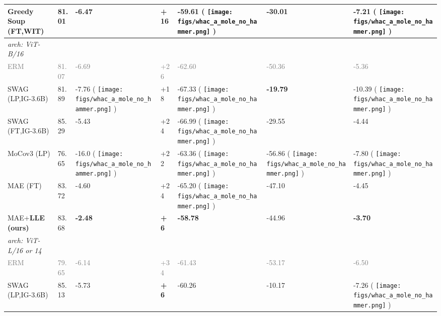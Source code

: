 \documentclass[10pt,twocolumn,letterpaper]{article}
\DeclareRobustCommand{\molenohammer}{\begingroup\normalfont
  \texttt{[image: figs/whac\_a\_mole\_no\_hammer.png]}\endgroup
}
\begin{document}
\begin{table}[t]
\begin{adjustbox}{width=\linewidth}
\begin{tabular}{@{}lllllll@{}}
Greedy Soup \scriptsize{(FT,WIT)}      & 81.01         & \textbf{-6.47}   & \textbf{+16} & -59.61 \scriptsize{(\textcolor{red}{} \molenohammer)} & -30.01 & -7.21  \scriptsize{(\textcolor{red}{} \molenohammer)}      \\\midrule
\textit{arch: ViT-B/16}                  &                    &          &           &          &         &                 \\
\textcolor{gray}{ERM}        & \textcolor{gray}{81.07}          & \textcolor{gray}{-6.69}   & \textcolor{gray}{+26}          & \textcolor{gray}{-62.60}           & \textcolor{gray}{-50.36}          & \textcolor{gray}{-5.36}                 \\
SWAG \scriptsize{(LP,IG-3.6B)}       & 81.89                   & -7.76  \scriptsize{(\textcolor{red}{} \molenohammer)}           & +18 & -67.33 \scriptsize{(\textcolor{red}{} \molenohammer)} & \textbf{-19.79} & -10.39  \scriptsize{(\textcolor{red}{} \molenohammer)}                         \\
SWAG \scriptsize{(FT,IG-3.6B)}       & 85.29                   & -5.43             & +24 & -66.99 \scriptsize{(\textcolor{red}{} \molenohammer)} & -29.55 & -4.44                           \\
MoCov3 \scriptsize{(LP)}           & 76.65                   & -16.0  \scriptsize{(\textcolor{red}{} \molenohammer)}            & +22 & -63.36 \scriptsize{(\textcolor{red}{} \molenohammer)} & -56.86 \scriptsize{(\textcolor{red}{} \molenohammer)} & -7.80 \scriptsize{(\textcolor{red}{} \molenohammer)}                           \\
MAE \scriptsize{(FT)}       & 83.72                   & -4.60             & +24 & -65.20 \scriptsize{(\textcolor{red}{} \molenohammer)} & -47.10 & -4.45                           \\
MAE+\textbf{LLE (ours)}         & 83.68                   & \textbf{-2.48}             & \textbf{+6} & \textbf{-58.78} & -44.96 & \textbf{-3.70}                           \\ \midrule
\textit{arch: ViT-L/16 or 14}                   &                    &          &           &          &         &                 \\
\textcolor{gray}{ERM}          & \textcolor{gray}{79.65}          & \textcolor{gray}{-6.14}   & \textcolor{gray}{+34}          & \textcolor{gray}{-61.43}           & \textcolor{gray}{-53.17}          & \textcolor{gray}{-6.50}                 \\
SWAG \scriptsize{(LP,IG-3.6B)}          & 85.13                  & -5.73           & \textbf{+6}  & -60.26          & -10.17           & -7.26 \scriptsize{(\textcolor{red}{} \molenohammer)}                         \\

\end{tabular}
\end{adjustbox}
\end{table}
\end{document}
